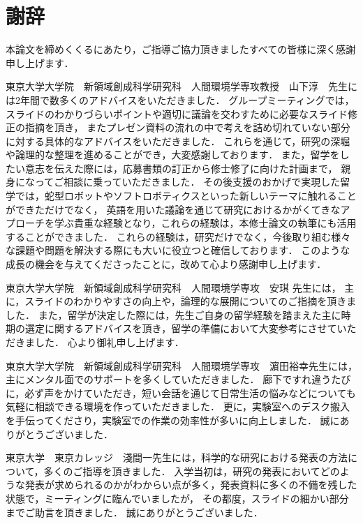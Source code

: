 \documentclass[../main]{subfiles}
\begin{document}
\chapter*{謝辞}
\label{thankyou}

\lhead[謝辞]{}
\thispagestyle{empty}

\newpage


本論文を締めくくるにあたり，ご指導ご協力頂きましたすべての皆様に深く感謝申し上げます．

東京大学大学院　新領域創成科学研究科　人間環境学専攻教授　山下淳　先生には2年間で数多くのアドバイスをいただきました．
グループミーティングでは，スライドのわかりづらいポイントや適切に議論を交わすために必要なスライド修正の指摘を頂き，
またプレゼン資料の流れの中で考えを詰め切れていない部分に対する具体的なアドバイスをいただきました．
これらを通じて，研究の深堀や論理的な整理を進めることができ，大変感謝しております．
また，留学をしたい意志を伝えた際には，応募書類の訂正から修士修了に向けた計画まで，
親身になってご相談に乗っていただきました．
その後支援のおかげで実現した留学では，蛇型ロボットやソフトロボティクスといった新しいテーマに触れることができただけでなく，
英語を用いた議論を通じて研究におけるかがくてきなアプローチを学ぶ貴重な経験となり，これらの経験は，本修士論文の執筆にも活用することができました．
これらの経験は，研究だけでなく，今後取り組む様々な課題や問題を解決する際にも大いに役立つと確信しております．
このような成長の機会を与えてくださったことに，改めて心より感謝申し上げます．


東京大学大学院　新領域創成科学研究科　人間環境学専攻　安琪 先生には，
主に，スライドのわかりやすさの向上や，論理的な展開についてのご指摘を頂きました．
また，留学が決定した際には，先生ご自身の留学経験を踏まえた主に時期の選定に関するアドバイスを頂き，留学の準備において大変参考にさせていただきました．
心より御礼申し上げます．

東京大学大学院　新領域創成科学研究科　人間環境学専攻　濵田裕幸先生には，主にメンタル面でのサポートを多くしていただきました．
廊下ですれ違うたびに，必ず声をかけていただき，短い会話を通じて日常生活の悩みなどについても気軽に相談できる環境を作っていただきました．
更に，実験室へのデスク搬入を手伝ってくださり，実験室での作業の効率性が多いに向上しました．
誠にありがとうございました．

東京大学　東京カレッジ　淺間一先生には，科学的な研究における発表の方法について，多くのご指導を頂きました．
入学当初は，研究の発表においてどのような発表が求められるのかがわからい点が多く，発表資料に多くの不備を残した状態で，ミーティングに臨んでいましたが，
その都度，スライドの細かい部分までご助言を頂きました．
誠にありがとうございました．
\end{document}
